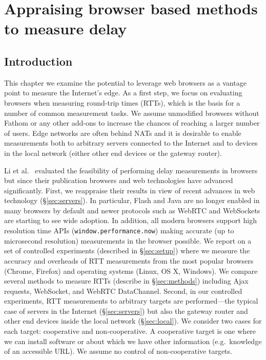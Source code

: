 \documentclass[12pt,twoside]{book}
\begin{document}
\chapter{Appraising browser based methods to measure delay}
\label{chap:delays}
\section{Introduction}

This chapter we examine the potential to leverage web browsers as a vantage point to measure the Internet's edge. 
As a first step, we focus on evaluating browsers when measuring round-trip times (RTTs), which is the basis for a number of common measurement tasks. We assume unmodified browsers without Fathom or any other add-ons to increase the chances of reaching a larger number of users. Edge networks are often behind NATs and it is desirable to enable measurements both to arbitrary servers connected to the Internet and to devices in the local network (either other end devices or the gateway router). 

Li et al.~\cite{li:imc2013} evaluated the feasibility of performing delay measurements in browsers but since their publication browsers and web technologies have advanced significantly. First, we reappraise their results in view of recent advances in web technology (\S\ref{sec:servers}). In particular, Flash and Java are no longer enabled in many browsers by default and newer protocols such as WebRTC and WebSockets are starting to see wide adoption. In addition, all modern browsers support high resolution time APIs (\texttt{window.performance.now}) making accurate (up to microsecond resolution) measurements in the browser possible. We report on a set of controlled experiments (described in \S\ref{sec:setup}) where we measure the accuracy and overheads of RTT measurements from the most popular browsers (Chrome, Firefox) and operating systems (Linux, OS X, Windows). We compare several methods to measure RTTs (describe in \S\ref{sec:methods}) including Ajax requests, WebSocket, and WebRTC DataChannel. 
Second, in our controlled experiments, RTT measurements to arbitrary targets are performed---the typical case of servers in the Internet (\S\ref{sec:servers}) but also the gateway router and other end devices inside the local network (\S\ref{sec:local}). We consider two cases for each target: cooperative and non-cooperative. A cooperative target is one where we can install software or about which we have other information (e.g.~knowledge of an accessible URL). We assume no control of non-cooperative targets.%
\end{document}
